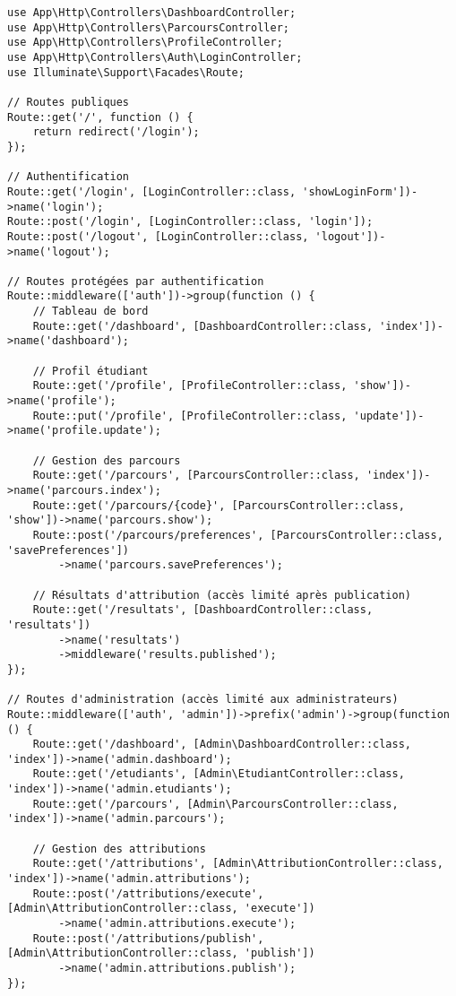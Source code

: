 \documentclass[french,12pt]{report} %
\begin{document}
\begin{lstlisting}[style=phpstyle,caption={Routage principal de l'application (routes/web.php)}]
use App\Http\Controllers\DashboardController;
use App\Http\Controllers\ParcoursController;
use App\Http\Controllers\ProfileController;
use App\Http\Controllers\Auth\LoginController;
use Illuminate\Support\Facades\Route;

// Routes publiques
Route::get('/', function () {
    return redirect('/login');
});

// Authentification
Route::get('/login', [LoginController::class, 'showLoginForm'])->name('login');
Route::post('/login', [LoginController::class, 'login']);
Route::post('/logout', [LoginController::class, 'logout'])->name('logout');

// Routes protégées par authentification
Route::middleware(['auth'])->group(function () {
    // Tableau de bord
    Route::get('/dashboard', [DashboardController::class, 'index'])->name('dashboard');
    
    // Profil étudiant
    Route::get('/profile', [ProfileController::class, 'show'])->name('profile');
    Route::put('/profile', [ProfileController::class, 'update'])->name('profile.update');
    
    // Gestion des parcours
    Route::get('/parcours', [ParcoursController::class, 'index'])->name('parcours.index');
    Route::get('/parcours/{code}', [ParcoursController::class, 'show'])->name('parcours.show');
    Route::post('/parcours/preferences', [ParcoursController::class, 'savePreferences'])
        ->name('parcours.savePreferences');
    
    // Résultats d'attribution (accès limité après publication)
    Route::get('/resultats', [DashboardController::class, 'resultats'])
        ->name('resultats')
        ->middleware('results.published');
});

// Routes d'administration (accès limité aux administrateurs)
Route::middleware(['auth', 'admin'])->prefix('admin')->group(function () {
    Route::get('/dashboard', [Admin\DashboardController::class, 'index'])->name('admin.dashboard');
    Route::get('/etudiants', [Admin\EtudiantController::class, 'index'])->name('admin.etudiants');
    Route::get('/parcours', [Admin\ParcoursController::class, 'index'])->name('admin.parcours');
    
    // Gestion des attributions
    Route::get('/attributions', [Admin\AttributionController::class, 'index'])->name('admin.attributions');
    Route::post('/attributions/execute', [Admin\AttributionController::class, 'execute'])
        ->name('admin.attributions.execute');
    Route::post('/attributions/publish', [Admin\AttributionController::class, 'publish'])
        ->name('admin.attributions.publish');
});
\end{lstlisting}
\end{document}
